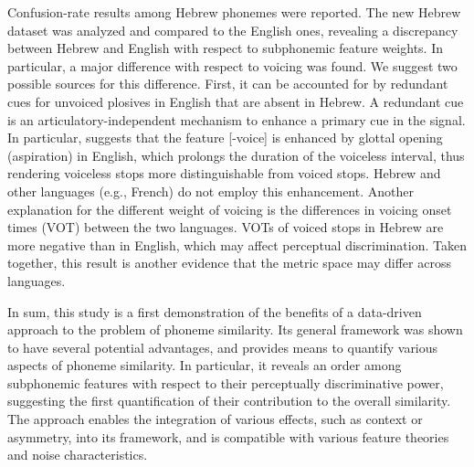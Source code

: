 Confusion-rate results among Hebrew phonemes were reported. The new Hebrew dataset was analyzed and compared to the English ones, revealing a discrepancy between Hebrew and English with respect to subphonemic feature weights. In particular, a major difference with respect to voicing was found. We suggest two possible sources for this difference. First, it can be accounted for by redundant cues for unvoiced plosives in English that are absent in Hebrew. A redundant cue is an articulatory-independent mechanism to enhance a primary cue in the signal. In particular, \citet{stevens1989primary} suggests that the feature [-voice] is enhanced by glottal opening (aspiration) in English, which prolongs the duration of the voiceless interval, thus rendering voiceless stops more distinguishable from voiced stops. Hebrew and other languages (e.g., French) do not employ this enhancement. Another explanation for the different weight of voicing is the differences in voicing onset times (VOT) \citep{Laufer1998} between the two languages. VOTs of voiced stops in Hebrew are more negative than in English, which may affect perceptual discrimination.  Taken together, this result is another evidence that the metric space may differ across languages.


In sum, this study is a first demonstration of the benefits of a data-driven approach to the problem of phoneme similarity. Its general framework was shown to have several potential advantages, and provides means to quantify various aspects of phoneme similarity. In particular, it reveals an order among subphonemic features with respect to their perceptually discriminative power, suggesting the first quantification of their contribution to the overall similarity. The approach enables the integration of various effects, such as context or asymmetry, into its framework, and is compatible with various feature theories and noise characteristics.